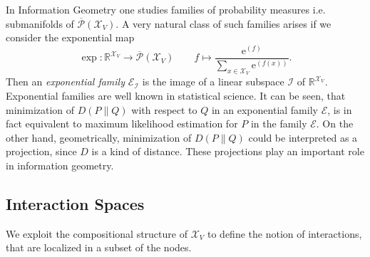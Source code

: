 \documentclass[12pt]{amsart}
\newcommand{\e}{\mathrm{e}} %
\theoremstyle{plain}%
\theoremstyle{definition}
\theoremstyle{remark}
\begin{document}
In Information Geometry one studies families of probability
measures i.e. submanifolds of $\overline{\mathcal{P}}(\mathcal{X}_V)$. A
very natural class of such families arises if we consider the
exponential map
\begin{equation*}
  \exp : \mathbb{R}^{\mathcal{X}_V} \to \overline{\mathcal{P}}(\mathcal{X}_V) 
  \qquad f \mapsto \frac{\e^{(f)}}{\sum_{x\in\mathcal{X}_V} \e^{(f(x))}}.
\end{equation*}
Then an \emph{exponential family} $\mathcal{E}_\mathcal{I}$ is the
image of a linear subspace $\mathcal{I}$ of $\mathbb{R}^{\mathcal{X}_V}$.
Exponential families are well known in statistical science. It can
be seen, that minimization of $D(P\parallel Q)$ with respect to $Q$
in an exponential family $\mathcal{E}$, is in fact equivalent to maximum
likelihood estimation for $P$ in the family $\mathcal{E}$. On the
other hand, geometrically, minimization of $D(P\parallel Q)$ could be
interpreted as a projection, since $D$ is a kind of distance. These projections 
play an important role in information geometry. 


\subsection{Interaction Spaces}
We exploit the compositional structure of $\mathcal{X}_V$ to 
define the notion of interactions, that are localized in a subset of the nodes. 
\end{document}
